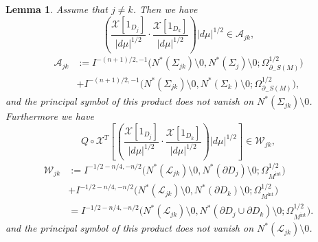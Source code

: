 \documentclass[a4paper,11pt,reqno]{amsart}
\numberwithin{equation}{section}
\newtheorem{lemma}[theorem]{Lemma}
\theoremstyle{definition}
\theoremstyle{remark}
\begin{document}
\begin{lemma}
\label{theorem:6-6}
Assume that $j{\ne}k$. Then we have 
%
%
\begin{equation}
\left(
\frac{\mathcal{X}[1_{D_j}]}{\lvert{d\mu}\rvert^{1/2}}
\cdot 
\frac{\mathcal{X}[1_{D_k}]}{\lvert{d\mu}\rvert^{1/2}}
\right)
\lvert{d\mu}\rvert^{1/2}
\in 
\mathcal{A}_{jk},
\label{equation:6-5}
\end{equation}
%
%
\begin{align*}
  \mathcal{A}_{jk}
& :=
  I^{-(n+1)/2, -1}\bigl(N^\ast(\Sigma_{jk})\setminus0,N^\ast(\Sigma_j)\setminus0; \Omega_{\partial_-S(M)}^{1/2}\bigr)
\\
& +
  I^{-(n+1)/2, -1}\bigl(N^\ast(\Sigma_{jk})\setminus0,N^\ast(\Sigma_k)\setminus0; \Omega_{\partial_-S(M)}^{1/2}\bigr),  
\end{align*}
%
%
and the principal symbol of this product does not vanish on $N^\ast(\Sigma_{jk})\setminus0$. 
Furthermore we have 
%
%
\begin{equation}
Q{\circ}\mathcal{X}^T
\left[
\left(
\frac{\mathcal{X}[1_{D_j}]}{\lvert{d\mu}\rvert^{1/2}}
\cdot 
\frac{\mathcal{X}[1_{D_k}]}{\lvert{d\mu}\rvert^{1/2}}
\right)
\lvert{d\mu}\rvert^{1/2}
\right]
\in 
\mathcal{W}_{jk},
\label{equation:6-6}
\end{equation}
%
%
\begin{align*}
  \mathcal{W}_{jk}
& :=
  I^{-1/2-n/4, -n/2}\bigl(N^\ast(\mathcal{L}_{jk})\setminus0,N^\ast(\partial{D_j})\setminus0; \Omega_{M^\text{int}}^{1/2}\bigr)
\\
& +
  I^{-1/2-n/4, -n/2}\bigl(N^\ast(\mathcal{L}_{jk})\setminus0,N^\ast(\partial{D_k})\setminus0; \Omega_{M^\text{int}}^{1/2}\bigr)
\\
& =
  I^{-1/2-n/4, -n/2}
  \bigl(
  N^\ast(\mathcal{L}_{jk})\setminus0,
  N^\ast(\partial{D_j}\cup\partial{D_k})\setminus0; 
  \Omega_{M^\text{int}}^{1/2}
  \bigr).  
\end{align*}
%
% 
and the principal symbol of this product does not vanish on $N^\ast(\mathcal{L}_{jk})\setminus0$. 
\end{lemma}
%
%
\end{document}

